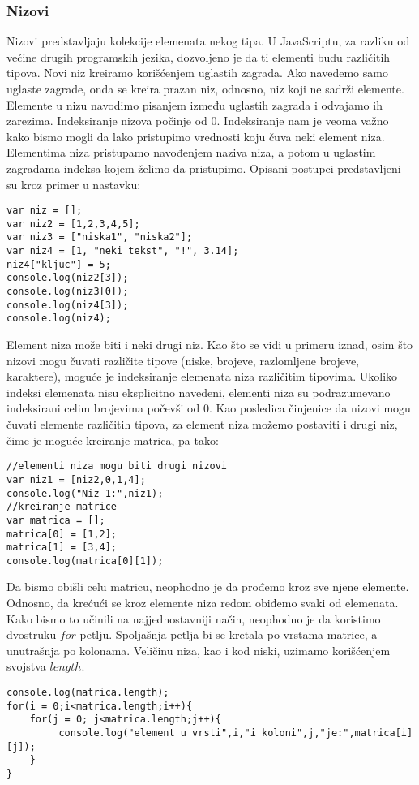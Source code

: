 \subsubsection{Nizovi}
Nizovi predstavljaju kolekcije elemenata nekog tipa. U JavaScriptu, za razliku od većine drugih programskih jezika, dozvoljeno je da ti elementi budu različitih tipova. Novi niz kreiramo korišćenjem uglastih zagrada. Ako navedemo samo uglaste zagrade, onda se kreira prazan niz, odnosno, niz koji ne sadrži elemente. Elemente u nizu navodimo pisanjem između uglastih zagrada i odvajamo ih zarezima. Indeksiranje nizova počinje od 0. Indeksiranje nam je veoma važno kako bismo mogli da lako pristupimo vrednosti koju čuva neki element niza. Elementima niza pristupamo navođenjem naziva niza, a potom u uglastim zagradama indeksa kojem želimo da pristupimo. Opisani postupci predstavljeni su kroz primer u nastavku:
\begin{lstlisting}[backgroundcolor = \color{lightgray}, breaklines=true]
var niz = [];
var niz2 = [1,2,3,4,5];
var niz3 = ["niska1", "niska2"];
var niz4 = [1, "neki tekst", "!", 3.14];
niz4["kljuc"] = 5;
console.log(niz2[3]);
console.log(niz3[0]);
console.log(niz4[3]);
console.log(niz4);
\end{lstlisting}
Element niza može biti i neki drugi niz. Kao što se vidi u primeru iznad, osim što nizovi mogu čuvati različite tipove (niske, brojeve, razlomljene brojeve, karaktere), moguće je indeksiranje elemenata niza različitim tipovima. Ukoliko indeksi elemenata nisu eksplicitno navedeni, elementi niza su podrazumevano indeksirani celim brojevima počevši od 0. Kao posledica činjenice da nizovi mogu čuvati elemente različitih tipova, za element niza možemo postaviti i drugi niz, čime je moguće kreiranje matrica, pa tako:
\begin{lstlisting}[backgroundcolor = \color{lightgray}, breaklines=true]
//elementi niza mogu biti drugi nizovi
var niz1 = [niz2,0,1,4];
console.log("Niz 1:",niz1);
//kreiranje matrice
var matrica = [];
matrica[0] = [1,2];
matrica[1] = [3,4];
console.log(matrica[0][1]);
\end{lstlisting}
Da bismo obišli celu matricu, neophodno je da prođemo kroz sve njene elemente. Odnosno, da krećući se kroz elemente niza redom obiđemo svaki od elemenata. Kako bismo to učinili na najjednostavniji način, neophodno je da koristimo dvostruku $for$ petlju. Spoljašnja petlja bi se kretala po vrstama matrice, a unutrašnja po kolonama. Veličinu niza, kao i kod niski, uzimamo korišćenjem svojstva $length$.
\begin{lstlisting}[backgroundcolor = \color{lightgray}, breaklines=true]
console.log(matrica.length);
for(i = 0;i<matrica.length;i++){
    for(j = 0; j<matrica.length;j++){
         console.log("element u vrsti",i,"i koloni",j,"je:",matrica[i][j]);
    }
}
\end{lstlisting}
